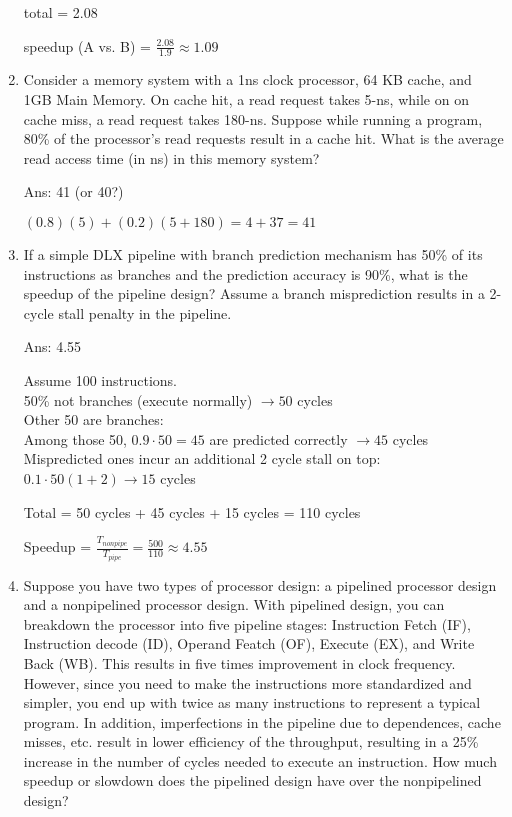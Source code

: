 \documentclass[12pt]{article}
\begin{document}
\begin{enumerate}
        total = 2.08

        speedup (A vs. B) = $\frac{2.08}{1.9} \approx 1.09$

        \item Consider a memory system with a 1ns clock processor, 64 KB cache, and 1GB Main Memory. On cache hit, a 
        read request takes 5-ns, while on on cache miss, a read request takes 180-ns. Suppose while running a program, 
        80\% of the processor’s read requests result in a cache hit. What is the average read access time (in ns) in 
        this memory system?

        Ans: 41 (or 40?)

        $(0.8)(5) + (0.2)(5 + 180) = 4 + 37 = 41$

        \item If a simple DLX pipeline with branch prediction mechanism has 50\% of its instructions as branches and 
        the prediction accuracy is 90\%, what is the speedup of the pipeline design? Assume a branch misprediction 
        results in a 2-cycle stall penalty in the pipeline.

        Ans: 4.55

        Assume 100 instructions.\\
        50\% not branches (execute normally) $\longrightarrow 50$ cycles\\
        Other 50 are branches:\\
        Among those 50, $0.9 \cdot 50 = 45$ are predicted correctly $\longrightarrow 45$ cycles\\
        Mispredicted ones incur an additional 2 cycle stall on top: $0.1 \cdot 50 (1 + 2) \longrightarrow 15$ cycles

        Total = 50 cycles + 45 cycles + 15 cycles = 110 cycles

        Speedup = $\frac{T_{nonpipe}}{T_{pipe}} = \frac{500}{110} \approx 4.55$

        \item Suppose you have two types of processor design: a pipelined processor design and a non­pipelined processor 
        design. With pipelined design, you can breakdown the processor into five pipeline stages: Instruction Fetch (IF), 
        Instruction decode (ID), Operand Featch (OF), Execute (EX), and Write Back (WB). This results in five times 
        improvement in clock frequency. However, since you need to make the instructions more standardized and simpler, 
        you end up with twice as many instructions to represent a typical program. In addition, imperfections in the 
        pipeline due to dependences, cache misses, etc. result in lower efficiency of the throughput, resulting in a 
        25\% increase in the number of cycles needed to execute an instruction. How much speedup or slowdown does the 
        pipelined design have over the non­pipelined design?


\end{enumerate}
\end{document}

